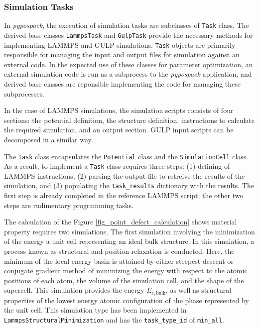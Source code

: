 \subsubsection{Simulation Tasks}
\label{sec:pypospack_tasks}

In \emph{pypospack}, the execution of simulation tasks are subclasses of \verb|Task| class.  The derived base classes \verb|LammpsTask| and \verb|GulpTask| provide the necessary methods for implementing LAMMPS and GULP simulations. \verb|Task| objects are primarily responsible for managing the input and output files for simulation against an external code.  In the expected use of these classes for parameter optimization, an external simulation code is run as a  subprocess to the  \emph{pypospack} application, and derived base classes are reponsible implementing the code for managing these subprocesses.

In the case of LAMMPS simulations, the simulation scripts consists of four sections:  the potential definition, the structure definition, instructions to calculate the required simulation, and an output section.  GULP input scripts can be decomposed in a similar way.

 The \verb|Task| class encapsulates the \verb|Potential| class and the \verb|SimulationCell| class.  As a result, to implement a \verb|Task| class requires three steps: (1) defining of LAMMPS instructions, (2) parsing the output file to retreive the results of the simulation, and (3) populating the \verb|task_results| dictionary with the results.  The first step is already completed in the reference LAMMPS script; the other two steps are rudimentary programming tasks.

The calculation of the Figure \ref{fig_point_defect_calculation} shows material property requires two simulations.  The first simulation involving the minimization of the energy a unit cell representing an ideal bulk structure.  In this simulation, a process known as structural and position relaxation is conducted.  Here, the  minimum of the local energy basin is attained by either steepest descent or conjugate gradient method of minimizing the energy with respect to the atomic positions of each atom, the volume of the simulation cell, and the shape of the supercell.  This simulation provides the energy $E_{c,\mathrm{bulk}}$, as well as structural properties of the lowest energy atomic configuration of the phase represented by the unit cell.  This simulation type has been implemented in  \verb|LammpsStructuralMinimization| and has the \verb|task_type_id| of \verb|min_all|.

